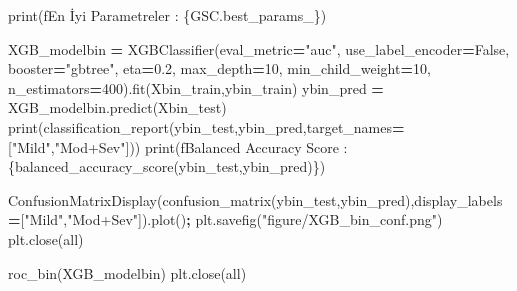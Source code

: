 \documentclass[12pt,twoside]{deuthesis}
\newenvironment{Shaded}{\begin{snugshade}}{\end{snugshade}}
\newcommand{\BuiltInTok}[1]{#1}
\newcommand{\DecValTok}[1]{\textcolor[rgb]{0.00,0.00,0.81}{#1}}
\newcommand{\FloatTok}[1]{\textcolor[rgb]{0.00,0.00,0.81}{#1}}
\newcommand{\NormalTok}[1]{#1}
\newcommand{\OperatorTok}[1]{\textcolor[rgb]{0.81,0.36,0.00}{\textbf{#1}}}
\newcommand{\SpecialCharTok}[1]{\textcolor[rgb]{0.00,0.00,0.00}{#1}}
\newcommand{\SpecialStringTok}[1]{\textcolor[rgb]{0.31,0.60,0.02}{#1}}
\newcommand{\StringTok}[1]{\textcolor[rgb]{0.31,0.60,0.02}{#1}}
\newcommand{\VariableTok}[1]{\textcolor[rgb]{0.00,0.00,0.00}{#1}}
\begin{document}
\begin{Shaded}
\begin{Highlighting}[]
\BuiltInTok{print}\NormalTok{(}\SpecialStringTok{f\textquotesingle{}En İyi Parametreler : }\SpecialCharTok{\{}\NormalTok{GSC}\SpecialCharTok{.}\NormalTok{best\_params\_}\SpecialCharTok{\}}\SpecialStringTok{\textquotesingle{}}\NormalTok{)}
\end{Highlighting}
\end{Shaded}
\begin{Shaded}
\begin{Highlighting}[]
\NormalTok{XGB\_modelbin }\OperatorTok{=}\NormalTok{ XGBClassifier(eval\_metric}\OperatorTok{=}\StringTok{"auc"}\NormalTok{,}
\NormalTok{                             use\_label\_encoder}\OperatorTok{=}\VariableTok{False}\NormalTok{,}
\NormalTok{                             booster}\OperatorTok{=}\StringTok{"gbtree"}\NormalTok{,}
\NormalTok{                             eta}\OperatorTok{=}\FloatTok{0.2}\NormalTok{,}
\NormalTok{                             max\_depth}\OperatorTok{=}\DecValTok{10}\NormalTok{,}
\NormalTok{                             min\_child\_weight}\OperatorTok{=}\DecValTok{10}\NormalTok{,}
\NormalTok{                             n\_estimators}\OperatorTok{=}\DecValTok{400}\NormalTok{).fit(Xbin\_train,ybin\_train)}
\NormalTok{ybin\_pred }\OperatorTok{=}\NormalTok{ XGB\_modelbin.predict(Xbin\_test)}
\BuiltInTok{print}\NormalTok{(classification\_report(ybin\_test,ybin\_pred,target\_names}\OperatorTok{=}\NormalTok{[}\StringTok{"Mild"}\NormalTok{,}\StringTok{"Mod+Sev"}\NormalTok{]))}
\BuiltInTok{print}\NormalTok{(}\SpecialStringTok{f\textquotesingle{}Balanced Accuracy Score : }\SpecialCharTok{\{}\NormalTok{balanced\_accuracy\_score(ybin\_test,ybin\_pred)}\SpecialCharTok{\}}\SpecialStringTok{\textquotesingle{}}\NormalTok{)}
\end{Highlighting}
\end{Shaded}
\begin{Shaded}
\begin{Highlighting}[]
\NormalTok{ConfusionMatrixDisplay(confusion\_matrix(ybin\_test,ybin\_pred),display\_labels}\OperatorTok{=}\NormalTok{[}\StringTok{"Mild"}\NormalTok{,}\StringTok{"Mod+Sev"}\NormalTok{]).plot()}\OperatorTok{;}
\NormalTok{plt.savefig(}\StringTok{"figure/XGB\_bin\_conf.png"}\NormalTok{)}
\NormalTok{plt.close(}\StringTok{\textquotesingle{}all\textquotesingle{}}\NormalTok{)}
\end{Highlighting}
\end{Shaded}
\begin{Shaded}
\begin{Highlighting}[]
\NormalTok{roc\_bin(XGB\_modelbin)}
\NormalTok{plt.close(}\StringTok{\textquotesingle{}all\textquotesingle{}}\NormalTok{)}
\end{Highlighting}
\end{Shaded}
\end{document}
